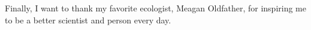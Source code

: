 \documentclass[twoside,12pt,final]{ucthesis-CA2012}
\begin{document}
\begin{ucfrontmatter}
\begin{acknowledgements}
    Finally, I want to thank my favorite ecologist, Meagan Oldfather, for
    inspiring me to be a better scientist and person every day.
  \end{acknowledgements}
% 
% 
% 
% 
% 
% 

  \begin{abstract}


\end{abstract}
\end{ucfrontmatter}
\end{document}
